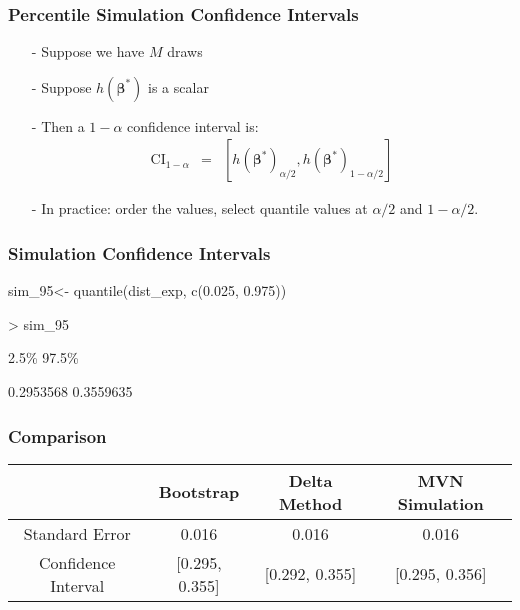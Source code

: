 \documentclass{beamer}
\begin{document}
\begin{frame}
\frametitle{Percentile Simulation Confidence Intervals}

\begin{itemize}
\item[-] Suppose we have $M$ draws 
\item[-] Suppose $h(\boldsymbol{\beta}^{*})$ is a scalar
\item[-] Then a $1-\alpha$ confidence interval is:
\begin{eqnarray}
\text{CI}_{1-\alpha} & = & \left[h(\boldsymbol{\beta}^{*})_{\alpha/2}, h(\boldsymbol{\beta}^{*})_{1 - \alpha/2}\right] \nonumber 
\end{eqnarray}
\item[-] In practice: order the values, select quantile values at $\alpha/2$ and $1- \alpha/2$.  
\end{itemize}


\end{frame}


\begin{frame}
\frametitle{Simulation Confidence Intervals}



\begin{semiverbatim}

sim\_95<- quantile(dist\_exp, c(0.025, 0.975))

> sim\_95

     2.5\%     97.5\% 

0.2953568 0.3559635 

\end{semiverbatim}



\end{frame}



\begin{frame}
\frametitle{Comparison}

\begin{tabular}{cccc}
\hline
	& Bootstrap & Delta Method & MVN Simulation \\
\hline	
Standard Error      &  0.016			 & 	0.016	      &  0.016\\
Confidence Interval & [0.295, 0.355]	 & [0.292, 0.355] & [0.295, 0.356]   \\
\hline
\end{tabular}



\end{frame}
\end{document}
